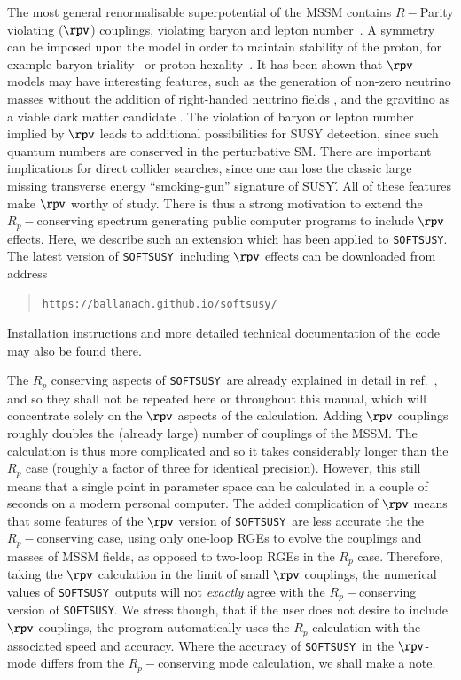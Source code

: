 \documentclass[final,3p,times,pdflatex]{elsarticle}
\def\SOFTSUSY{{\tt SOFTSUSY}}
\begin{document}
The most general renormalisable superpotential of the  MSSM
contains $R-$Parity violating ($\rpv$) 
couplings, violating
baryon and lepton number~\cite{Dreiner:1997uz}. A symmetry can be imposed upon
the model in order to maintain stability of the proton, for example baryon
triality~\cite{Ibanez:1991pr} or proton hexality~\cite{Dreiner:2007vp}.
It has been shown
that $\rpv$ models may have interesting features, such as the generation of
non-zero neutrino masses without the addition of
right-handed neutrino fields \cite{Hall:1983id}, and the gravitino as a viable
dark matter candidate \cite{Buchmuller:2007ui}. The 
violation of baryon or lepton number implied by $\rpv$ leads
to additional possibilities for SUSY detection, since such quantum numbers are 
conserved in the perturbative SM\@. There are important implications
for direct 
collider searches, since one can lose the classic large missing transverse
energy ``smoking-gun'' signature of SUSY\'. All of these features make $\rpv$
worthy of study. There is thus a strong motivation to extend the
$R_p-$conserving spectrum generating public computer programs to include
$\rpv$ effects. Here, we describe such an extension which has
been applied to \SOFTSUSY\@. The latest version of \SOFTSUSY~including
$\rpv$ effects can be downloaded from address
\begin{quote}
{\tt https://ballanach.github.io/softsusy/}
\end{quote}
Installation instructions and more detailed technical documentation of the
code may also be found there.

The $R_p$ conserving aspects of \SOFTSUSY~are already explained in
detail in ref.~\cite{Allanach:2001kg}, and so they shall not be repeated here
or throughout this manual, which will concentrate solely on the $\rpv$ aspects of the calculation.
Adding $\rpv$ couplings roughly doubles the (already large)
number of couplings of the MSSM\@. The calculation is thus more complicated and 
so it takes considerably longer than the $R_p$ case (roughly a
factor of three for identical precision). However, this still means that a
single point in parameter space can be calculated in a couple of seconds on a
modern personal computer. 
The added complication of $\rpv$ means that some features of the 
$\rpv$ version of \SOFTSUSY~are less accurate the the $R_p-$conserving 
case, using only one-loop RGEs to evolve the couplings and masses of MSSM
fields, as opposed to two-loop RGEs in the $R_p$ case. Therefore, taking the
$\rpv$ calculation in the limit of small $\rpv$ couplings, the numerical
values of \SOFTSUSY~outputs will not {\em exactly}\/ agree with the
$R_p-$conserving 
version of \SOFTSUSY\@. 
We stress though, that if the user does not desire to include $\rpv$ couplings, 
the program automatically uses the $R_p$ calculation with the associated speed and
accuracy. Where the accuracy of \SOFTSUSY~in the $\rpv$-mode differs from the
$R_p-$conserving mode calculation, we shall make a 
note.
\end{document}
